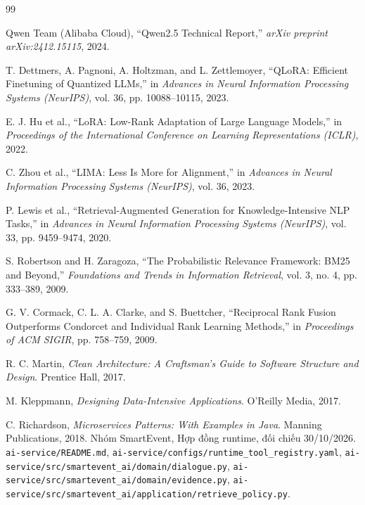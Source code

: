 \begin{thebibliography}{99}
{}
\small
\setlength{\itemsep}{2.5pt}
\setlength{\parskip}{0pt}

Qwen Team (Alibaba Cloud), ``Qwen2.5 Technical Report,'' \textit{arXiv preprint arXiv:2412.15115}, 2024.

T. Dettmers, A. Pagnoni, A. Holtzman, and L. Zettlemoyer, ``QLoRA: Efficient Finetuning of Quantized LLMs,'' in \textit{Advances in Neural Information Processing Systems (NeurIPS)}, vol. 36, pp. 10088--10115, 2023.

E. J. Hu et al., ``LoRA: Low-Rank Adaptation of Large Language Models,'' in \textit{Proceedings of the International Conference on Learning Representations (ICLR)}, 2022.

C. Zhou et al., ``LIMA: Less Is More for Alignment,'' in \textit{Advances in Neural Information Processing Systems (NeurIPS)}, vol. 36, 2023.

P. Lewis et al., ``Retrieval-Augmented Generation for Knowledge-Intensive NLP Tasks,'' in \textit{Advances in Neural Information Processing Systems (NeurIPS)}, vol. 33, pp. 9459--9474, 2020.

S. Robertson and H. Zaragoza, ``The Probabilistic Relevance Framework: BM25 and Beyond,'' \textit{Foundations and Trends in Information Retrieval}, vol. 3, no. 4, pp. 333--389, 2009.

G. V. Cormack, C. L. A. Clarke, and S. Buettcher, ``Reciprocal Rank Fusion Outperforms Condorcet and Individual Rank Learning Methods,'' in \textit{Proceedings of ACM SIGIR}, pp. 758--759, 2009.

R. C. Martin, \textit{Clean Architecture: A Craftsman's Guide to Software Structure and Design}. Prentice Hall, 2017.

M. Kleppmann, \textit{Designing Data-Intensive Applications}. O'Reilly Media, 2017.

C. Richardson, \textit{Microservices Patterns: With Examples in Java}. Manning Publications, 2018.
Nhóm SmartEvent, Hợp đồng runtime, đối chiếu 30/10/2026. \nolinkurl{ai-service/README.md}, \nolinkurl{ai-service/configs/runtime_tool_registry.yaml}, \nolinkurl{ai-service/src/smartevent_ai/domain/dialogue.py}, \nolinkurl{ai-service/src/smartevent_ai/domain/evidence.py}, \nolinkurl{ai-service/src/smartevent_ai/application/retrieve_policy.py}.


\end{thebibliography}
